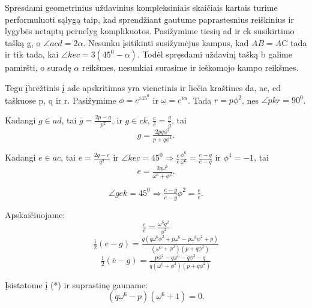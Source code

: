 \begin{sprendimas}

Spresdami geometrinius uždavinius kompleksiniais skaičiais kartais turime performuluoti sąlygą taip, kad sprendžiant gautume paprastesnius reiškinius ir lygybės netaptų pernelyg komplikuotos. Pasižymime tiesių ad ir ck susikirtimo tašką g, o $\angle acd = 2\alpha$. Nesunku įsitikinti susižymėjus kampus, kad $AB=A$C tada ir tik tada, kai $\angle kec=3(45^0-\alpha)$. Todėl spręsdami uždavinį tašką b galime pamiršti, o suradę $\alpha$ reikšmes, nesunkiai surasime ir ieškomojo kampo reikšmes.

Tegu įbrėžtinis į adc apskritimas yra vienetinis ir liečia kraštines da, ac, cd  taškuose p, q ir r. Pasižymime $\phi=e^{i45^0}$ ir $\omega=e^{i\alpha}$. Tada $r=p\phi^2$, nes $\angle pkr=90^0$.

Kadangi $g\in ad$, tai $\overline{g}=\tfrac{2p-g}{p^2}$, ir $g\in ck$, $\tfrac{c}{\overline{c}}=\tfrac{g}{\overline{g}}$, tai
\begin{equation*}
g=\tfrac{2pq\phi ^2}{p+q\phi^2}.
\end{equation*}

Kadangi $e\in ac$, tai $\overline{e}=\tfrac{2q-e}{q^2}$ ir $\angle kec=45^0 \Rightarrow  \tfrac{e}{\overline{e}}\tfrac{\phi^6}{\omega^6}= \tfrac{e-q}{\overline{e}-\overline{q}}$ ir $\phi^4=-1$, tai
\begin{equation*}
e=\tfrac{2q\omega^6}{\omega^6 +\phi ^2}.
\end{equation*}

\begin{equation*}
\angle gek = 45^0 \Rightarrow \tfrac{e-g}{\overline{e}-\overline{g}}\phi^2=\tfrac{e}{\overline{e}}.\tag{*}
\end{equation*}

Apskaičiuojame:
\begin{equation*}
\tfrac{e}{\overline{e}}= \tfrac{\omega^6q^2}{\phi^2} 
\end{equation*}
\begin{equation*}
\tfrac{1}{2}(e-g)=\tfrac{q(q\omega^6\phi^2 +p\omega^6 -p\omega^6\phi^2 +p)}{(\omega^6+\phi^2)(p +q\phi^2)}
\end{equation*}
\begin{equation*}
\tfrac{1}{2}(\overline{e}-\overline{g})=\tfrac{p\phi^2 -q\omega^6 -q\phi^2 - q}{q(\omega^6+\phi^2)(p +q\phi^2)}
\end{equation*}

Įsistatome į (*) ir suprastinę gauname:
\begin{equation*}
(q\omega^6 -p)(\omega^6+1)=0. \tag{**}
\end{equation*}


\end{sprendimas}
